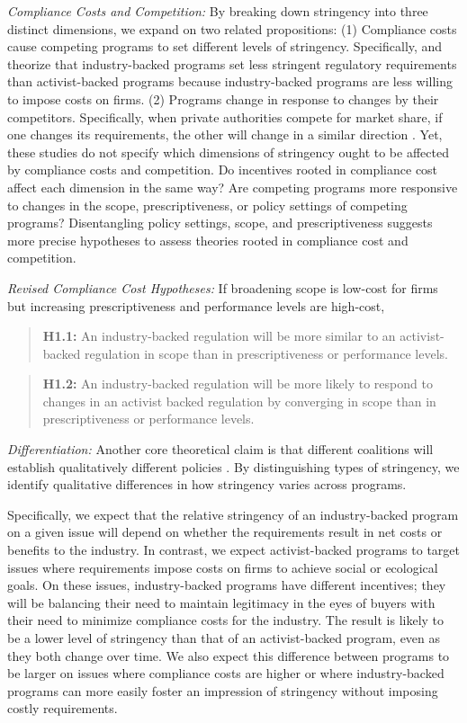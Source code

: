 \documentclass[
      12pt,
            Review ]{article}
\begin{document}
\emph{Compliance Costs and Competition:} By breaking down stringency into three distinct dimensions, we expand on two related propositions: (1) Compliance costs cause competing programs to set different levels of stringency. Specifically, \citet{Cashore2004} and \citet{Fischer2014} theorize that industry-backed programs set less stringent regulatory requirements than activist-backed programs because industry-backed programs are less willing to impose costs on firms. (2) Programs change in response to changes by their competitors. Specifically, when private authorities compete for market share, if one changes its requirements, the other will change in a similar direction \citep{Fischer2014, Smith2010}. Yet, these studies do not specify which dimensions of stringency ought to be affected by compliance costs and competition. Do incentives rooted in compliance cost affect each dimension in the same way? Are competing programs more responsive to changes in the scope, prescriptiveness, or policy settings of competing programs? Disentangling policy settings, scope, and prescriptiveness suggests more precise hypotheses to assess theories rooted in compliance cost and competition.

\emph{Revised Compliance Cost Hypotheses:} If broadening scope is low-cost for firms but increasing prescriptiveness and performance levels are high-cost,

\begin{quote}
\textbf{H1.1:} An industry-backed regulation will be more similar to an activist-backed regulation in scope than in prescriptiveness or performance levels.
\end{quote}

\begin{quote}
\textbf{H1.2:} An industry-backed regulation will be more likely to respond to changes in an activist backed regulation by converging in scope than in prescriptiveness or performance levels.
\end{quote}

\emph{Differentiation:} Another core theoretical claim is that different coalitions will establish qualitatively different policies \citep{Botzem2012, Hsueh2012}. By distinguishing types of stringency, we identify qualitative differences in how stringency varies across programs.

Specifically, we expect that the relative stringency of an industry-backed program on a given issue will depend on whether the requirements result in net costs or benefits to the industry. In contrast, we expect activist-backed programs to target issues where requirements impose costs on firms to achieve social or ecological goals. On these issues, industry-backed programs have different incentives; they will be balancing their need to maintain legitimacy in the eyes of buyers with their need to minimize compliance costs for the industry. The result is likely to be a lower level of stringency than that of an activist-backed program, even as they both change over time. We also expect this difference between programs to be larger on issues where compliance costs are higher or where industry-backed programs can more easily foster an impression of stringency without imposing costly requirements.
\end{document}
